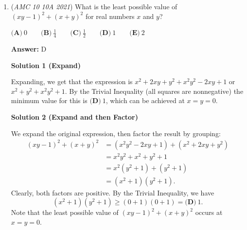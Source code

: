 \begin{enumerate}
$1.\overline{ab}=1+\dfrac{\overline{ab}_{10}}{10^2-1}=1+\dfrac{10a+b}{99}$ and $1.ab=1+\dfrac{a}{10}+\dfrac{b}{100}$, so our equation is 
 \[66\times\left(1+\dfrac{10a+b}{99}\right)=66\times\left(1+\dfrac{a}{10}+\dfrac{b}{100}\right)+0.5,\]so now let's simplify!\begin{align*}66\times\left(1+\dfrac{10a+b}{99}\right)&=66\times\left(1+\dfrac{a}{10}+\dfrac{b}{100}\right)+0.5\\1+\dfrac{10a+b}{99}&=1+\dfrac{a}{10}+\dfrac{b}{100}+\dfrac1{132}\\\dfrac{10a+b}{99}&=\dfrac{10a+b}{100}+\dfrac1{132}.\end{align*}
Notice that the $2$-digit number $\overline{ab}$ is just $10a+b$. Therefore, let's just find the value of $10a+b$.\newpage\begin{align*}\left(\dfrac1{99}-\dfrac1{100}\right)(10a+b)&=\dfrac1{132}\\10a+b&=\dfrac{\dfrac1{132}}{\dfrac1{99}-\dfrac1{100}}\\10a+b&=\dfrac{\dfrac1{132}}{\dfrac{100-99}{99\times100}}\\10a+b&=\dfrac{9900}{132}\\10a+b&=75.\end{align*}
We just got $10a+b=75$, and $75$ is indeed a $2$-digit number, so the two-digit number $\overline{ab}$ is $\boxed{75}$.

 Note: This video is unavailable

 


	\item (\textit{AMC 10 10A 2021}) What is the least possible value of $(xy-1)^2 + (x+y)^2$ for real numbers $x$ and $y$?


 $\textbf{(A)} ~0\qquad\textbf{(B)} ~\frac{1}{4}\qquad\textbf{(C)} ~\frac{1}{2}\qquad\textbf{(D)} ~1\qquad\textbf{(E)} ~2$

 \textbf{Answer: }D



\textbf{Solution 1 (Expand)}

Expanding, we get that the expression is $x^2+2xy+y^2+x^2y^2-2xy+1$ or $x^2+y^2+x^2y^2+1$. By the Trivial Inequality (all squares are nonnegative) the minimum value for this is $\boxed{\textbf{(D)} ~1}$, which can be achieved at $x=y=0$. 

 



\textbf{Solution 2 (Expand and then Factor)}

We expand the original expression, then factor the result by grouping:
 \begin{align*} (xy-1)^2+(x+y)^2&=\left(x^2y^2-2xy+1\right)+\left(x^2+2xy+y^2\right) \\ &=x^2y^2+x^2+y^2+1 \\ &=x^2\left(y^2+1\right)+\left(y^2+1\right) \\ &=\left(x^2+1\right)\left(y^2+1\right). \end{align*}
Clearly, both factors are positive. By the Trivial Inequality, we have 
 \[\left(x^2+1\right)\left(y^2+1\right)\geq\left(0+1\right)\left(0+1\right)=\boxed{\textbf{(D)} ~1}.\]Note that the least possible value of $(xy-1)^2+(x+y)^2$ occurs at $x=y=0.$





\end{enumerate}
